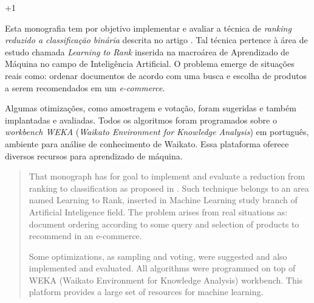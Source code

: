 \documentclass[12pt, a4paper, normaltoc, capchap, capsec, times]{abnt}
\begin{document}
\looseness+1


\capa
\folhaderosto

\begin{resumo}
Esta monografia tem por objetivo implementar e avaliar a técnica de \emph{ranking reduzido a classificação binária} descrita no artigo \cite{langford08}. Tal técnica pertence à área de estudo chamada \emph{Learning to Rank} inserida na macroárea de Aprendizado de Máquina no campo de Inteligência Artificial. O problema emerge de situações reais como: ordenar documentos de acordo com uma busca e escolha de produtos a serem recomendados em um \emph{e-commerce}.

Algumas otimizações, como amostragem e votação, foram sugeridas e também implantadas e avaliadas. Todos os algoritmos foram programados sobre o \emph{workbench WEKA} (\emph{Waikato Environment for Knowledge Analysis}) em português, ambiente para análise de conhecimento de Waikato. Essa plataforma oferece diversos recursos para aprendizado de máquina.

\end{resumo}

\begin{abstract}
That monograph has for goal to implement and evaluate a reduction from ranking to classification as proposed in \cite{langford08}. Such technique belongs to an area named Learning to Rank, inserted in Machine Learning study branch of Artificial Inteligence field. The problem arises from real situations as: document ordering according to some query and selection of products to recommend in an e-commerce.

Some optimizations, as sampling and voting, were suggested and also implemented and evaluated. All algorithms were programmed on top of WEKA (Waikato Environment for Knowledge Analysis) workbench. This platform provides a large set of resources for machine learning.

\end{abstract}

\linespread{0.9}
    \sumario
\linespread{1}

\ProximoForaDoSumario
\listadefiguras
\end{document}
